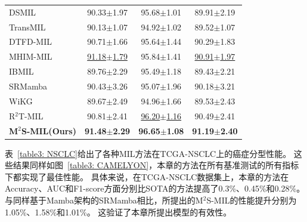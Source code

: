 {\begin{xltabular}{\textwidth}{XCCC}
  DSMIL~\cite{li2021dual}          & 90.33$\pm$1.97&95.68$\pm$1.01&89.91$\pm$2.19\\
  TransMIL~\cite{shao2021transmil} &  90.13$\pm$1.07&94.92$\pm$1.02&89.52$\pm$1.07\\
  DTFD-MIL~\cite{zhang2022dtfd}    &90.71$\pm$1.66&95.64$\pm$1.44&90.29$\pm$1.83\\
  MHIM-MIL~\cite{tang2023multiple}    & \underline{91.18$\pm$1.79}&95.84$\pm$1.41&\underline{90.91$\pm$1.97}\\
  IBMIL~\cite{lin2023interventional}    &89.76$\pm $2.29&95.49$\pm$1.18&89.43$\pm$2.21\\
  SRMamba~\cite{yang2024mambamil}&  90.43$\pm$3.26&95.07$\pm$1.96&90.18$\pm$3.21\\
  WiKG ~\cite{li2024dynamic}&  89.67$\pm$2.49&94.96$\pm$1.66&89.53$\pm$2.43\\
  R$^2$T-MIL ~\cite{tang2024feature}& 90.81$\pm$2.41& \underline{96.20$\pm$1.16}&90.49$\pm$2.41\\
   \textbf{M$^2$S-MIL(Ours)}&  \textbf{91.48$\pm$2.29}& \textbf{96.65$\pm$1.08}&\textbf{91.19$\pm$2.40}\\

\end{xltabular}}

表~\ref{table3: NSCLC}给出了各种MIL方法在TCGA-NSCLC上的癌症分型性能。
这些结果同样如图~\ref{table3: CAMELYON}，本章的方法在所有基准测试的所有指标下都实现了最佳性能。
具体来说，在TCGA-NSCLC数据集上，本章的方法在Accuracy、AUC和F1-score方面分别比SOTA的方法提高了0.3\%、0.45\%和0.28\%。
与同样基于Mamba架构的SRMamba相比，所提出的M$^2$S-MIL的性能提升分别为1.05\%、1.58\%和1.01\%。
这验证了本章所提出模型的有效性。

